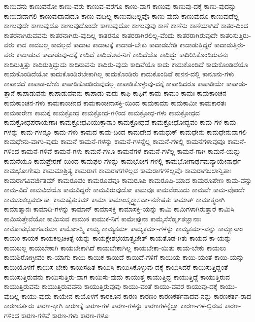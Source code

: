 {ಕಾಣುವನು
ಕಾಣುವನೋ
ಕಾಣು-ವರು
ಕಾಣುವ-ವರೆಗೂ
ಕಾಣು-ವಾಗ
ಕಾಣುವು
ಕಾಣುವು-ದಕ್ಕೆ
ಕಾಣು-ವುದನ್ನು
ಕಾಣುವುದಾಗಲಿ
ಕಾಣುವುದಾವುದೂ
ಕಾಣು-ವುದಿಲ್ಲ
ಕಾಣುವುದಿಲ್ಲವೊ
ಕಾಣು-ವುದು
ಕಾಣುವುದೂ
ಕಾಣುವುದೆಲ್ಲ
ಕಾಣುವುದೇ
ಕಾಣುವುದೊ
ಕಾಣುವುದೊಂದೇ
ಕಾಣುವುದೋ
ಕಾಣುವುವು
ಕಾಣೆ
ಕಾಣೆನು
ಕಾಣೆಯಾಗಿದೆ
ಕಾತರ-ದಿಂದ
ಕಾತರನಾಗಿರುವವನು
ಕಾತರನಾಗಿರು-ವುದಿಲ್ಲ
ಕಾತರನೂ
ಕಾತರರಾಗಿರಲಿಲ್ಲ-ವೆಂದು
ಕಾತರರಾಗಿರುವುದೇ
ಕಾತರಿಸುತ್ತಿರು-ವರು
ಕಾದ
ಕಾದಬಲ್ಲ
ಕಾದಲ್ಲದೆ
ಕಾದಾಟ
ಕಾದಾಟಕ್ಕೆ
ಕಾದಾಡ-ಬೇಕು
ಕಾದಾಡಬೇಡಿ
ಕಾದಾಡುತ್ತಿದ್ದರೆ
ಕಾದಾಡುತ್ತಿರು-ವರು
ಕಾದಾಡುವ
ಕಾದಾಡುವು-ದಕ್ಕೆ
ಕಾದಿದೆ
ಕಾದಿದೆಅವ-ನಿಗೆ
ಕಾದಿದೆಯೊ
ಕಾದಿದ್ದು
ಕಾದಿರಿಸಿಕೊಂಡಿರುವನು
ಕಾದಿರುತ್ತಿತ್ತು
ಕಾದಿರುತ್ತಿದ್ದುದು
ಕಾದಿರುವನು
ಕಾದಿರು-ವುದು
ಕಾದಿವೆಯೊ
ಕಾದು
ಕಾದುಕೊಂಡಿದೆ
ಕಾದುಕೊಂಡಿದೆಯೊ
ಕಾದುಕೊಂಡಿದೆಯೋ
ಕಾದುಕೊಂಡಿರಬೇಕಾಗಿಲ್ಲ
ಕಾದುಕೊಂಡಿರು
ಕಾದುಕೊಂಡಿವೆ
ಕಾನನ-ದಲ್ಲಿ
ಕಾನೂನು-ಗಳು
ಕಾಪಾಡದೆ
ಕಾಪಾಡ-ಬೇಕು
ಕಾಪಾಡಿಕೊಂಡಿರುವುದಲ್ಲ
ಕಾಪಾಡಿಕೊಳ್ಳುವು-ದಕ್ಕೆ
ಕಾಪಾಡಿದರೂ
ಕಾಪಾಡಿಯೇ
ಕಾಪಾಡು-ತ್ತಾನೆ
ಕಾಪಾಡುವನು
ಕಾಪಾಡುವವನು
ಕಾಪಾಡು-ವುದು
ಕಾಫಿ
ಕಾಫಿಗೆ
ಕಾಮ
ಕಾಮಂ
ಕಾಮಃ
ಕಾಮಕಾಂಚನ
ಕಾಮಕಾಂಚನ-ಗಳು
ಕಾಮಕಾಂಚನದ
ಕಾಮಕಾಂಚನಾಸಕ್ತಿ-ಯಿಂದ
ಕಾಮಕಾಮಾ
ಕಾಮಕಾಮೀ
ಕಾಮಕಾರತಃ
ಕಾಮಕಾರೇಣ
ಕಾಮಕ್ಕೆ
ಕಾಮಕ್ರೋಧ
ಕಾಮಕ್ರೋಧ-ಗಳಿಂದ
ಕಾಮಕ್ರೋಧ-ಗಳು
ಕಾಮಕ್ರೋಧದ
ಕಾಮಕ್ರೋಧಪರಾಯಣಾಃ
ಕಾಮಕ್ರೋಧವಿಯುಕ್ತಾನಾಂ
ಕಾಮಕ್ರೋಧವೆ
ಕಾಮಕ್ರೋಧೋದ್ಭವಂ
ಕಾಮ-ಗಳ
ಕಾಮ-ಗಳನ್ನು
ಕಾಮ-ಗಳನ್ನೂ
ಕಾಮ-ಗಳು
ಕಾಮದ
ಕಾಮ-ದಿಂದ
ಕಾಮದೇವ
ಕಾಮಧುಕ್
ಕಾಮಧೇನು
ಕಾಮಧೇನುವಾಗಲಿ
ಕಾಮಧೇನು-ವಾಗು-ವುದು
ಕಾಮನೆ
ಕಾಮನೆ-ಗಳನ್ನು
ಕಾಮನೆ-ಗಳನ್ನೆಲ್ಲ
ಕಾಮನೆ-ಗಳಲ್ಲಿ
ಕಾಮನೆಗಳಾವುವೂ
ಕಾಮನೆ-ಗಳಿಂದ
ಕಾಮನೆ-ಗಳಿವೆ
ಕಾಮನೆ-ಗಳು
ಕಾಮನೆ-ಗಳೂ
ಕಾಮನೆಗಳೆ
ಕಾಮನೆ-ಗಳೆಲ್ಲ
ಕಾಮನೆ-ಗಾಗಿ
ಕಾಮನೆ-ಯನ್ನು
ಕಾಮನೆಯೂ
ಕಾಮಪ್ರೇರಣೆ-ಯಿಂದ
ಕಾಮಫಲ-ಗಳನ್ನು
ಕಾಮಭೋಗ-ಗಳಲ್ಲಿ
ಕಾಮಭೋಗಾರ್ಥಮನ್ಯಾಯೇನಾರ್ಥ
ಕಾಮಭೋಗೇಷು
ಕಾಮಮಾಶ್ರಿತ್ಯ
ಕಾಮರಾಗ
ಕಾಮರಾಗಗಳಿಲ್ಲದ
ಕಾಮರಾಗಗಳಿಲ್ಲವೊ
ಕಾಮರಾಗಬಲಾನ್ವಿತಾಃ
ಕಾಮರಾಗವಿವರ್ಜಿತಮ್
ಕಾಮರೂಪಂ
ಕಾಮರೂಪವೂ
ಕಾಮರೂಪಿ
ಕಾಮರೂಪಿ-ಯಾದ
ಕಾಮರೂಪೇಣ
ಕಾಮ-ವನ್ನು
ಕಾಮ-ವಿದೆ
ಕಾಮವಿದೆಯೊ
ಕಾಮವಿದ್ದರೇ
ಕಾಮವಿರುವುದೋ
ಕಾಮವೂ
ಕಾಮವೆಂಬುದು
ಕಾಮವೇ
ಕಾಮ-ವೊಂದೇ
ಕಾಮಸಂಕಲ್ಪವರ್ಜಿತಾಃ
ಕಾಮಹೈತುಕಮ್
ಕಾಮಾ
ಕಾಮಾಂಸ್ತ್ಯಕ್ತ್ವಾಸರ್ವಾನಶೇಷತಃ
ಕಾಮಾತ್
ಕಾಮಾತ್ಮರಾಗಿ
ಕಾಮಾತ್ಮಾನಃ
ಕಾಮಾದಿ-ಗಳನ್ನು
ಕಾಮಾನ್
ಕಾಮಾಸಕ್ತಿ
ಕಾಮಾಸಕ್ತಿ-ಯನ್ನು
ಕಾಮಿ
ಕಾಮಿಗಳಾಗಿರುತ್ತಾರೆ
ಕಾಮಿಸಿ
ಕಾಮಿಸುತ್ತೇವೆಯೋ
ಕಾಮಿಸುವ
ಕಾಮುಕ
ಕಾಮುಕ-ನಿಗೆ
ಕಾಮೇಪ್ಸುನಾ
ಕಾಮೈಸೆಸೆರ್ಹೃತಜ್ಞಾನಾಃ
ಕಾಮೋಪಭೋಗಪರಮಾ
ಕಾಮೋಽಸ್ಮಿ
ಕಾಮ್ಯ
ಕಾಮ್ಯಕರ್ಮ
ಕಾಮ್ಯಕರ್ಮ-ಗಳನ್ನು
ಕಾಮ್ಯಕರ್ಮ-ವನ್ನು
ಕಾಮ್ಯಾನಾಂ
ಕಾಯಂ
ಕಾಯಕ
ಕಾಯಕಲ್ಪಚಿಕಿತ್ಸೆ-ಯನ್ನು
ಕಾಯಕ್ಲೇಶಭಯಾತ್ತ್ಯಜೇತ್
ಕಾಯತೊಡ-ಗಿತು
ಕಾಯದ
ಕಾ-ಯನ್ನು
ಕಾಯಬಲ್ಲ
ಕಾಯಬೇಕಾಗಿ
ಕಾಯಬೇಕಾಗಿದೆ
ಕಾಯಬೇಕಾಗಿಲ್ಲ
ಕಾಯಬೇಕಾ-ಯಿತು
ಕಾಯ-ಬೇಕು
ಕಾಯಲು
ಕಾಯಶಿರೋಗ್ರೀವಂ
ಕಾ-ಯಾಗು
ಕಾಯಿ
ಕಾಯಿಕ
ಕಾಯಿದೆ
ಕಾಯಿದೆ-ಗಳಿಗೆ
ಕಾಯಿಯ
ಕಾಯಿ-ಯಂತೆ
ಕಾಯಿ-ಯನ್ನು
ಕಾಯಿಯೊಳಗೆ
ಕಾಯಿಸ-ಬೇಕು
ಕಾಯಿಸಹಿತ
ಕಾಯಿಸಿ
ಕಾಯಿಸಿಕೊಳ್ಳುವು-ದಕ್ಕೆ
ಕಾಯಿಸಿದರೆ
ಕಾಯಿಸುತ್ತಿದ್ದಂತೆ
ಕಾಯಿಸುತ್ತಿರುವನು
ಕಾಯಿಸುತ್ತಿರು-ವಾಗ
ಕಾಯಿಸು-ವುದು
ಕಾಯುತ್ತ
ಕಾಯುತ್ತಿದ್ದ
ಕಾಯುತ್ತಿದ್ದೆ
ಕಾಯುತ್ತಿರುವ
ಕಾಯುತ್ತಿರುವನು
ಕಾಯುತ್ತಿರುವವನು
ಕಾಯುತ್ತಿರುವುವು
ಕಾಯು-ವಂತೆ
ಕಾಯು-ವವರ
ಕಾಯುವು-ದಕ್ಕೆ
ಕಾಯು-ವುದಿಲ್ಲ
ಕಾಯು-ವುದು
ಕಾಯೇನ
ಕಾಯೊಳಗೆ
ಕಾರಕೂನ
ಕಾರಣ
ಕಾರಣಂ
ಕಾರಣಕರ್ತನಾದವ-ನನ್ನು
ಕಾರಣಕರ್ತ-ರಾದ
ಕಾರಣಕರ್ತರು
ಕಾರಣ-ಕ್ಕಾಗಿ
ಕಾರಣಕ್ಕೆ
ಕಾರಣ-ಗಳ
ಕಾರಣ-ಗಳನ್ನು
ಕಾರಣಗಳನ್ನೆಲ್ಲಾ
ಕಾರಣ-ಗಳ-ಲ್ಲಿರುವ
ಕಾರಣ-ಗಳಿಂದ
ಕಾರಣ-ಗಳಿವೆ
ಕಾರಣ-ಗಳು
ಕಾರಣ-ಗಳೂ
}
